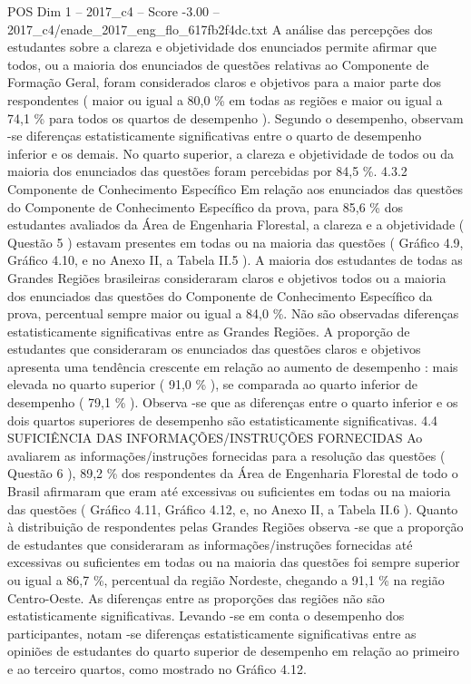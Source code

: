 \begin{textsample}{POS Dim 1 – 2017\_c4 – Score -3.00 – 2017\_c4/enade\_2017\_eng\_flo\_617fb2f4dc.txt}
A análise das percepções dos estudantes sobre a clareza e objetividade dos enunciados permite afirmar que todos, ou a maioria dos enunciados de questões relativas ao Componente de Formação Geral, foram considerados claros e objetivos para a maior parte dos respondentes ( maior ou igual a 80,0 \% em todas as regiões e maior ou igual a 74,1 \% para todos os quartos de desempenho ).
Segundo o desempenho, observam -se diferenças estatisticamente significativas entre o quarto de desempenho inferior e os demais.
No quarto superior, a clareza e objetividade de todos ou da maioria dos enunciados das questões foram percebidas por 84,5 \%. 4.3.2 Componente de Conhecimento Específico Em relação aos enunciados das questões do Componente de Conhecimento Específico da prova, para 85,6 \% dos estudantes avaliados da Área de Engenharia Florestal, a clareza e a objetividade ( Questão 5 ) estavam presentes em todas ou na maioria das questões ( Gráfico 4.9, Gráfico 4.10, e no Anexo II, a Tabela II.5 ).
A maioria dos estudantes de todas as Grandes Regiões brasileiras consideraram claros e objetivos todos ou a maioria dos enunciados das questões do Componente de Conhecimento Específico da prova, percentual sempre maior ou igual a 84,0 \%.
Não são observadas diferenças estatisticamente significativas entre as Grandes Regiões.
A proporção de estudantes que consideraram os enunciados das questões claros e objetivos apresenta uma tendência crescente em relação ao aumento de desempenho : mais elevada no quarto superior ( 91,0 \% ), se comparada ao quarto inferior de desempenho ( 79,1 \% ).
Observa -se que as diferenças entre o quarto inferior e os dois quartos superiores de desempenho são estatisticamente significativas. 4.4 SUFICIÊNCIA DAS INFORMAÇÕES/INSTRUÇÕES FORNECIDAS Ao avaliarem as informações/instruções fornecidas para a resolução das questões ( Questão 6 ), 89,2 \% dos respondentes da Área de Engenharia Florestal de todo o Brasil afirmaram que eram até excessivas ou suficientes em todas ou na maioria das questões ( Gráfico 4.11, Gráfico 4.12, e, no Anexo II, a Tabela II.6 ).
Quanto à distribuição de respondentes pelas Grandes Regiões observa -se que a proporção de estudantes que consideraram as informações/instruções fornecidas até excessivas ou suficientes em todas ou na maioria das questões foi sempre superior ou igual a 86,7 \%, percentual da região Nordeste, chegando a 91,1 \% na região Centro-Oeste.
As diferenças entre as proporções das regiões não são estatisticamente significativas.
Levando -se em conta o desempenho dos participantes, notam -se diferenças estatisticamente significativas entre as opiniões de estudantes do quarto superior de desempenho em relação ao primeiro e ao terceiro quartos, como mostrado no Gráfico 4.12.

\end{textsample}
